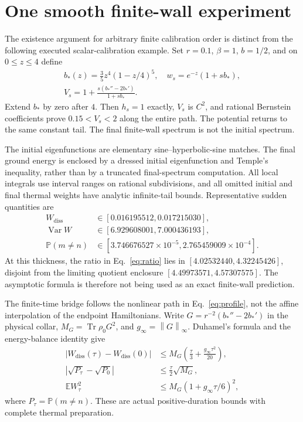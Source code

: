 \documentclass[aps,pra,reprint,superscriptaddress,longbibliography]{revtex4-2}
\newcommand{\Tr}{\operatorname{Tr}}
\newcommand{\Var}{\operatorname{Var}}
\newcommand{\Wd}{W_{\mathrm{diss}}}
\newcommand{\E}{\mathbb E}
\newcommand{\Prob}{\mathbb P}
\newcommand{\norm}[1]{\left\lVert#1\right\rVert}
\begin{document}
\section{One smooth finite-wall experiment}

The existence argument for arbitrary finite calibration order is distinct from the following executed scalar-calibration example. Set $r=0.1$, $\beta=1$, $b=1/2$, and on $0\le z\le4$ define
\begin{equation}
 \begin{gathered}
 b_*(z)=\frac35z^4(1-z/4)^5,\quad
 w_s=e^{-z}(1+sb_*),\\
 V_s=1+\frac{s(b_*''-2b_*')}{1+sb_*}.
 \end{gathered}\label{eq:profile}
\end{equation}
Extend $b_*$ by zero after $4$. Then $h_s=1$ exactly, $V_s$ is $C^2$, and rational Bernstein coefficients prove $0.15<V_s<2$ along the entire path. The potential returns to the same constant tail. The final finite-wall spectrum is not the initial spectrum.

The initial eigenfunctions are elementary sine--hyperbolic-sine matches. The final ground energy is enclosed by a dressed initial eigenfunction and Temple's inequality, rather than by a truncated final-spectrum computation. All local integrals use interval ranges on rational subdivisions, and all omitted initial and final thermal weights have analytic infinite-tail bounds. Representative sudden quantities are
\begin{align}
 \Wd&\in[0.016195512,0.017215030],\nonumber\\
 \Var W&\in[6.929608001,7.000436193],\nonumber\\
 \Prob(m\ne n)&\in[3.746676527\!\times\!10^{-5},
                         2.765459009\!\times\!10^{-4}].\label{eq:benchmark}
\end{align}
At this thickness, the ratio in Eq.~\eqref{eq:ratio} lies in $[4.02532440,4.32245426]$, disjoint from the limiting quotient enclosure $[4.49973571,4.57307575]$. The asymptotic formula is therefore not being used as an exact finite-wall prediction.

The finite-time bridge follows the nonlinear path in Eq.~\eqref{eq:profile}, not the affine interpolation of the endpoint Hamiltonians. Write $G=r^{-2}(b_*''-2b_*')$ in the physical collar, $M_G=\Tr\rho_0G^2$, and $g_\infty=\norm G_\infty$. Duhamel's formula and the energy-balance identity give
\begin{align}
 |\Wd(\tau)-\Wd(0)|&\le M_G\left(\frac\tau3+
                        \frac{g_\infty\tau^2}{20}\right),\label{eq:meanbridge}\\
 |\sqrt{P_\tau}-\sqrt{P_0}|&\le\frac\tau2\sqrt{M_G},\label{eq:pbridge}\\
 \E W_\tau^2&\le M_G(1+g_\infty\tau/6)^2,\label{eq:m2bridge}
\end{align}
where $P_\tau=\Prob(m\ne n)$. These are actual positive-duration bounds with complete thermal preparation.
\end{document}
